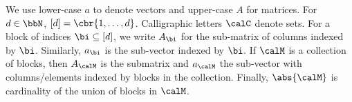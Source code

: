 
We use lower-case \( a \) to denote vectors and upper-case \( A \) for matrices.
For \( d \in \bbN \), \( [d] = \cbr{1, \ldots, d} \).
Calligraphic letters \( \calC \) denote sets.
For a block of indices \( \bi \subseteq [d] \),
we write \( A_{\bi} \) for the sub-matrix of columns indexed by \( \bi \).
Similarly, \( a_{\bi} \) is the sub-vector indexed by \( \bi \).
If \( \calM \) is a collection of blocks, then \( A_\calM \) is the submatrix
and \( a_\calM \) the sub-vector with columns/elements indexed by blocks in
the collection.
Finally, \( \abs{\calM} \) is cardinality of the union of blocks in \( \calM \).
